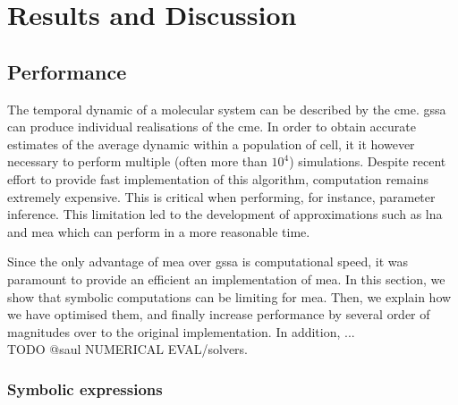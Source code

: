 \section{Results and Discussion} \label{results}


\subsection{Performance}\label{performance}
The temporal dynamic of a molecular system can be described by the \gls{cme}.
\gls{gssa}\cite{gillespie_general_1976} can produce individual realisations of the \gls{cme}.
In order to obtain accurate estimates of the average dynamic within a population of cell, it it however necessary to perform multiple (often more than $10^4$) simulations.
Despite recent effort \cite{niemi_efficient_2011,dittamo_optimized_2009,komarov_accelerating_2012} to provide fast implementation of this algorithm, computation remains extremely expensive.
This is critical when performing, for instance, parameter inference. 
This limitation led to the development of approximations such as \gls{lna}\cite{komorowski_bayesian_2009} and \gls{mea}\cite{ale_general_2013} which can perform in a more reasonable time.

Since the only advantage of \gls{mea} over \gls{gssa} is computational speed, it was paramount to provide an efficient an implementation of \gls{mea}.
In this section, we show that symbolic computations can be limiting for \gls{mea}. 
Then, we explain how we have optimised them, and finally increase performance by several order of magnitudes over to the original \mat{} implementation.
In addition, ...\\
TODO @saul NUMERICAL EVAL/solvers.


\subsubsection{Symbolic expressions}


